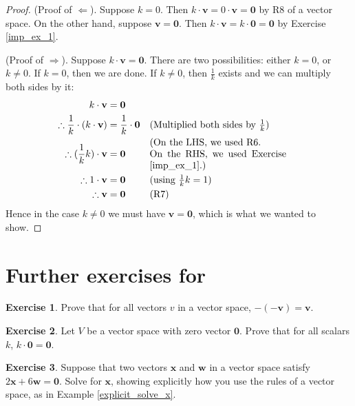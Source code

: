 \documentclass[a4paper,11pt]{book}
\theoremstyle{definition}
\newtheorem{exercise}{Exercise}
\newcommand{\ve}[1]{\mathbf{#1}}
\newcommand{\furtherexercises}{\section*{Further exercises for \thesection}}
\begin{document}
\begin{proof} (Proof of $\Leftarrow$). Suppose $k=0$. Then $k \cdot \ve{v} = 0 \cdot \ve{v} = \ve{0}$ by R8 of a vector space. On the other hand, suppose $\ve{v} = \ve{0}$. Then $k \cdot \ve{v} = k \cdot \ve{0} = \ve{0}$ by Exercise \ref{imp_ex_1}. 

(Proof of $\Rightarrow$). Suppose $k \cdot \ve{v} = \ve{0}$. There are two possibilities: either $k = 0$, or $k \neq 0$. If $k=0$, then we are done. If $k \neq 0$, then $\frac{1}{k}$ exists and we can multiply both sides by it:
\begin{align*}
 	 k \cdot \ve{v} & = \ve{0} \\
 	\therefore  \frac{1}{k} \cdot (k \cdot \ve{v})  & = \frac{1}{k} \cdot \ve{0} && \mbox{(Multiplied both sides by $\frac{1}{k}$)} \\
 	\therefore (\frac{1}{k} k) \cdot \ve{v} &= \ve{0} && \mbox{\begin{minipage}{5cm} (On the LHS, we used R6. \\ On the RHS, we used Exercise \ref{imp_ex_1}.) \end{minipage} } \\
 	\therefore 1 \cdot \ve{v} &= \ve{0} && \mbox{(using $\frac{1}{k} k = 1$)} \\
 	\therefore \ve{v} &= \ve{0} && \mbox{(R7)} 
\end{align*}	
Hence in the case $k \neq 0$ we must have $\ve{v} = \ve{0}$, which is what we wanted to show.
\end{proof}



\furtherexercises
\begin{exercise} Prove that for all vectors $v$ in a vector space, $-(-\ve{v}) = \ve{v}$.
\end{exercise}


\begin{exercise} \label{mult_by_zero_ex} Let $V$ be a vector space with zero vector $\ve{0}$. Prove that for all scalars $k$, $k \cdot \ve{0} = \ve{0}$. \label{imp_ex_1}
\end{exercise}

\begin{exercise} Suppose that two vectors $\ve{x}$ and $\ve{w}$ in a vector space satisfy $2 \ve{x} + 6 \ve{w} = \ve{0}$. Solve for $\ve{x}$, showing explicitly how you use the rules of a vector space, as in Example \ref{explicit_solve_x}.
\end{exercise}
\end{document}
